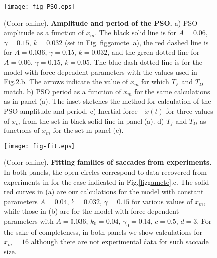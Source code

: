 \documentclass[prl]{revtex4}
\begin{document}
\begin{figure}  
\texttt{[image: fig-PSO.eps]}
\caption{(Color online). {\bf Amplitude and period of the PSO.} a) PSO amplitude as a function of $x_m$. The black solid line is for $A=0.06$, $\gamma=0.15$, $k=0.032$ (set in Fig.\ref{figgamcte}.a), the red dashed line is for $A=0.036$, $\gamma=0.15$, $k=0.032$, and the green dotted line for $A=0.06$, $\gamma=0.15$, $k=0.05$. The blue dash-dotted line is for the model with force dependent parameters with the values used in Fig.\ref{figfit}.b. The arrows indicate the value of $x_m$ for which $T_F$ and $T_\Omega$ match. b) PSO period as a function of $x_m$ for the same calculations as in panel (a). The inset sketches the method for calculation of the PSO amplitude and period. c) Inertial force $-\ddot{x}(t)$ for three values of $x_m$ from the set in black solid line in panel (a). d) $T_f$ and $T_\Omega$ as functions of $x_m$ for the set in panel (c). 
\label{figPSO}}
\end{figure}


\begin{figure}  
\texttt{[image: fig-fit.eps]}
\caption{(Color online). {\bf Fitting families of saccades from experiments}. In both panels, the open circles correspond to data recovered from experiments in \cite{holm} for the case indicated in Fig.\ref{figgamcte}.c. The solid red curves in (a) are our calculations for the model with constant parameters $A=0.04$, $k=0.032$, $\gamma=0.15$ for various values of $x_m$, while those in (b) are for the model with force-dependent parameters with $A=0.036$, $k_0=0.04$, $\gamma_0=0.14$, $c=0.5$, $d=3$. For the sake of completeness, in both panels we show calculations for $x_m=16$ although there are not experimental data for such saccade size.}
\label{figfit}
\end{figure}
\end{document}
